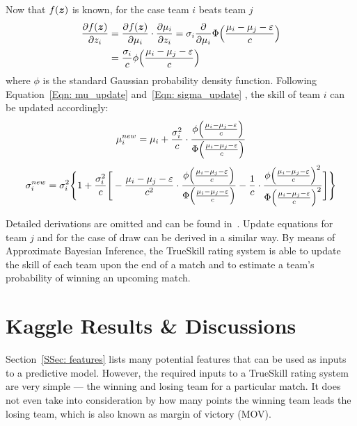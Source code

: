 Now that $f(\bm{z})$ is known, for the case team $i$ beats team $j$
\begin{equation}
\begin{split}
\frac{\partial f(\bm{z})}{\partial z_{i}} &= \frac{\partial f(\bm{z})}{\partial \mu_{i}} \cdot \frac{\partial \mu_{i}}{\partial z_{i}} = \sigma_{i}\frac{\partial}{\partial \mu_{i}}\Phi \Big{(} \frac{\mu_{i} - \mu_{j} - \varepsilon}{c}  \Big{)} \\
&= \frac{\sigma_{i}}{c} \phi \Big{(} \frac{\mu_{i} - \mu_{j} - \varepsilon}{c}  \Big{)}
\end{split}
\end{equation}
where $\phi$ is the standard Gaussian probability density function. Following Equation~\ref{Eqn: mu_update} and~\ref{Eqn: sigma_update} , the skill of team $i$ can be updated accordingly:
\begin{equation}
\mu_{i}^{new} = \mu_{i} + \frac{\sigma_{i}^{2}}{c} \cdot \frac{\phi \Big{(} \frac{\mu_{i} - \mu_{j} - \varepsilon}{c}  \Big{)}}{\Phi \Big{(} \frac{\mu_{i} - \mu_{j} - \varepsilon}{c}  \Big{)}}
\end{equation}
\begin{equation}
\sigma_{i}^{new} = \sigma_{i}^{2} 
\Bigg{\{} 
1 + \frac{\sigma_{i}^{2}}{c} 
\Bigg{[} 
-\frac{\mu_{i} - \mu_{j} - \varepsilon}{c^{2}} \cdot \frac{\phi \Big{(} \frac{\mu_{i} - \mu_{j} - \varepsilon}{c}  \Big{)}}{\Phi \Big{(} \frac{\mu_{i} - \mu_{j} - \varepsilon}{c}  \Big{)}}
-\frac{1}{c} \cdot  \frac{\phi \Big{(} \frac{\mu_{i} - \mu_{j} - \varepsilon}{c}  \Big{)}^{2}}{\Phi \Big{(} \frac{\mu_{i} - \mu_{j} - \varepsilon}{c}
 \Big{)}^{2}}
\Bigg{]}
\Bigg{\}}
\end{equation}

Detailed derivations are omitted and can be found in~\cite{RC11}. Update equations for team $j$ and for the case of draw can be derived in a similar way. By means of Approximate Bayesian Inference, the TrueSkill rating system is able to update the skill of each team upon the end of a match and to estimate a team's probability of winning an upcoming match. 

\section{Kaggle Results \& Discussions}\label{Sec: imp}

Section~\ref{SSec: features} lists many potential features that can be used as inputs to a predictive model. However, the required inputs to a TrueSkill rating system are very simple --- the winning and losing team for a particular match. It does not even take into consideration by how many points the winning team leads the losing team, which is also known as margin of victory (MOV). 

